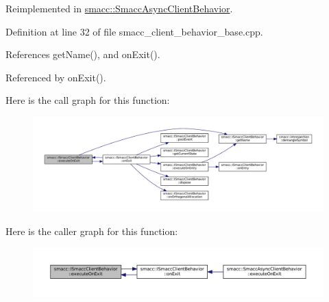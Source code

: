 Reimplemented in \hyperlink{classsmacc_1_1SmaccAsyncClientBehavior_a3d982d370df4f133ad37c0b2370e9b82}{smacc\+::\+Smacc\+Async\+Client\+Behavior}.



Definition at line 32 of file smacc\+\_\+client\+\_\+behavior\+\_\+base.\+cpp.



References get\+Name(), and on\+Exit().



Referenced by on\+Exit().


Here is the call graph for this function\+:
\nopagebreak
\begin{figure}[H]
\begin{center}
\leavevmode
\includegraphics[width=350pt]{classsmacc_1_1ISmaccClientBehavior_ac88fbad78c928b4bca6d18659ddfd8c0_cgraph}
\end{center}
\end{figure}
Here is the caller graph for this function\+:
\nopagebreak
\begin{figure}[H]
\begin{center}
\leavevmode
\includegraphics[width=350pt]{classsmacc_1_1ISmaccClientBehavior_ac88fbad78c928b4bca6d18659ddfd8c0_icgraph}
\end{center}
\end{figure}
\mbox{\label{classsmacc_1_1ISmaccClientBehavior_a34fde34e48fa13db622ee60d8374d0b8}} 
